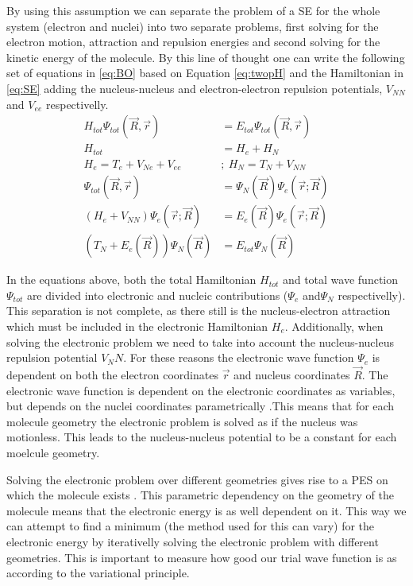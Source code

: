 \documentclass[../master_thesis.tex]{subfiles}
\begin{document}
By using this assumption we can separate the problem of a \ac{SE} for the whole
system (electron and nuclei) into two separate problems, first solving for the
electron motion, attraction and repulsion energies and second solving for the
kinetic energy of the molecule\cite{Cramer:2004}. By this line of thought one
can write the following set of equations in \ref{eq:BO} based on Equation
\ref{eq:twopH} and the Hamiltonian in \ref{eq:SE} adding the nucleus-nucleus
and electron-electron repulsion potentials, $ V_{NN} $ and $ V_{ee} $
respectivelly.
\begin{equation}
  \begin{split}\label{eq:BO}
    H_{tot}\Psi_{tot}(\vec{R}, \vec{r}) &= E_{tot}\Psi_{tot}(\vec{R},
    \vec{r})\\
    H_{tot} &= H_e + H_N \\
    H_e = T_e + V_{Ne} + V_{ee} ~&;~ H_N = T_N + V_{NN} \\
    \Psi_{tot}(\vec{R}, \vec{r}) &= \Psi_N(\vec{R})\Psi_e(\vec{r}; \vec{R}) \\
    (H_e + V_{NN})\Psi_e(\vec{r}; \vec{R}) &= E_e(\vec{R})\Psi_e(\vec{r};
    \vec{R})\\
    (T_N + E_e(\vec{R}))\Psi_N(\vec{R}) &= E_{tot}\Psi_N(\vec{R})
  \end{split}
\end{equation}

In the equations above, both the total Hamiltonian $H_{tot}$ and total
wave function $\Psi_{tot}$ are divided into electronic and nucleic contributions
($\Psi_e$ and$\Psi_N$ respectivelly). This separation is not complete, as there
still is the nucleus-electron attraction which must be included in the
electronic Hamiltonian $H_e$. Additionally, when solving the electronic problem
we need to take into account the nucleus-nucleus repulsion potential $V_NN$.
For these reasons the electronic wave function $\Psi_e$ is dependent on both the
electron coordinates $\vec{r}$ and nucleus coordinates $\vec{R}$. The
electronic wave function is dependent on the electronic coordinates as
variables, but depends on the nuclei coordinates parametrically
\cite{Jensen:2017}.This means that for each molecule geometry the electronic
problem is solved as if the nucleus was motionless. This leads to the
nucleus-nucleus potential to be a constant for each moelcule geometry.

Solving the electronic problem over different geometries gives rise to a
\ac{PES} on which the molecule exists \cite{Cramer:2004}. This parametric
dependency on the geometry of the molecule means that the electronic energy is
as well dependent on it. This way we can attempt to find a minimum (the method
used for this can vary) for the electronic energy by iterativelly solving the
electronic problem with different geometries. This is important to measure how
good our trial wave function is as according to the variational principle.
\end{document}
